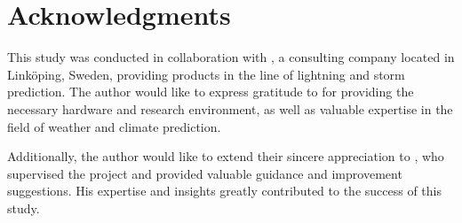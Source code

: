 
\chapter*{Acknowledgments}
\label{sec:acknowledgements}

This study was conducted in collaboration with \getcompany{}, a consulting company located in Linköping, Sweden, providing products in the line of lightning and storm prediction. The author would like to express gratitude to \getcompany{} for providing the necessary hardware and research environment, as well as valuable expertise in the field of weather and climate prediction.

Additionally, the author would like to extend their sincere appreciation to \getsupervisor{}, who supervised the project and provided valuable guidance and improvement suggestions. His expertise and insights greatly contributed to the success of this study.

